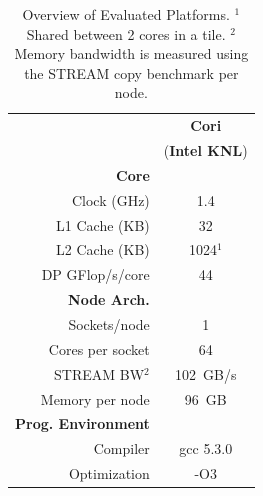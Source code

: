 
{
\setlength{\tabcolsep}{5pt}
\begin{table}[!t]{
\centering
\begin{tabular}{rc}
					&  {\bf Cori}  \\
					& ({\bf Intel KNL}) 	\\
\hline%
{\bf Core }	 	 & 			\\

\hline%
Clock (GHz)			& 1.4						\\
L1 Cache (KB)		& 32					\\
L2 Cache (KB)		& 1024$^1$				\\
DP GFlop/s/core		& 44					\\
\hline%
{\bf Node Arch.}	 	 & 			 \\
\hline%
Sockets/node			&  1							\\
Cores per socket			& 64							\\
STREAM BW$^2$		&  102~GB/s 		\\
Memory per node		&  96~GB				\\
\hline%
{\bf Prog. Environment}	 	 & 			 \\
\hline%
Compiler & gcc 5.3.0 \\
Optimization & -O3  \\
\hline%
\end{tabular}

\caption{Overview of Evaluated Platforms.  $^1$Shared between 2 cores in a tile. $^2$Memory bandwidth is measured using the STREAM copy benchmark per node.}
\label{tab:machines}
}
\end{table}
}


